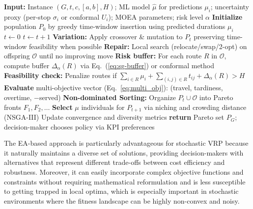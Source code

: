 \documentclass[preprint,12pt]{elsarticle}
\begin{document}
 \begin{algorithm}[H]
  \caption{Forecast-aware MOEA for Stochastic CVRPTW}
  \label{alg:moea-svrp}
  \begin{algorithmic}[1]
  \State \textbf{Input:} Instance $(G,t,c,[a,b],H)$; ML model $\widehat{\mu}$ for predictions $\mu_i$; uncertainty proxy (per-stop $\sigma_i$ or conformal $U_i$); MOEA parameters; risk level $\alpha$
  \State \textbf{Initialize} population $P_0$ by greedy time-window insertion using predicted durations $\mu_i$
  \State $t \leftarrow 0$
      \State $t \leftarrow t + 1$
      \State \textbf{Variation:} Apply crossover \& mutation to $P_t$ preserving time-window feasibility when possible
      \State \textbf{Repair:} Local search (relocate/swap/2-opt) on offspring $\mathcal{O}$ until no improving move
      \State \textbf{Risk buffer:} For each route $R$ in $\mathcal{O}$, compute buffer $\Delta_\alpha(R)$ via Eq.~(\ref{eq:sg-buffer}) or conformal method
      \State \textbf{Feasibility check:} Penalize routes if $\sum_{i\in R}\mu_i+\sum_{(i,j)\in R} t_{ij}+\Delta_\alpha(R)>H$
      \State \textbf{Evaluate} multi-objective vector (Eq.~\ref{eq:multi_obj}): (travel, tardiness, overtime, $-$served)
      \State \textbf{Non-dominated Sorting:} Organize $P_t \cup \mathcal{O}$ into Pareto fronts $F_1, F_2, \ldots$
      \State \textbf{Select} $\mu$ individuals for $P_{t+1}$ via niching and crowding distance (NSGA-III)
      \State Update convergence and diversity metrics
  \EndWhile
  \State \textbf{return} Pareto set $P_G$; decision-maker chooses policy via KPI preferences
  \end{algorithmic}
  \end{algorithm}


The EA-based approach is particularly advantageous for stochastic VRP because it naturally maintains a diverse set of solutions, providing decision-makers with alternatives that represent different trade-offs between cost efficiency and robustness.
Moreover, it can easily incorporate complex objective functions and constraints without requiring mathematical reformulation and is less susceptible to getting trapped in local optima, which is especially important in stochastic environments where the fitness landscape can be highly non-convex and noisy.
\end{document}
